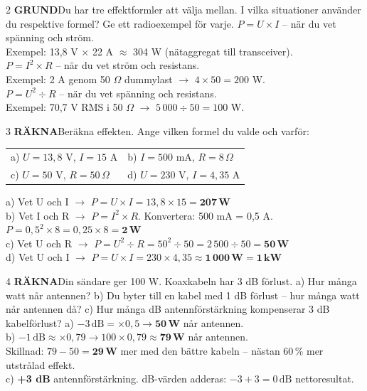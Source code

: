 \documentclass[a4paper,11pt,twoside]{book}
\newcommand{\qgrund}{\colorbox{greenpale}{\textcolor{greendark}{\headingfont\bfseries\tiny GRUND}}}
\newcommand{\qrakna}{\colorbox{bluepale}{\textcolor{bluedark}{\headingfont\bfseries\tiny RÄKNA}}}
\begin{document}
\begin{facitblock}{2}
\qgrund\quad Du har tre effektformler att välja mellan. I vilka situationer använder du respektive formel? Ge ett radioexempel för varje.
\tcblower
$P = U \times I$ – när du vet spänning och ström.\\
Exempel: 13,8 V $\times$ 22 A $\approx$ 304 W (nätaggregat till transceiver).\\[4pt]
$P = I^2 \times R$ – när du vet ström och resistans.\\
Exempel: 2 A genom 50 $\Omega$ dummylast $\rightarrow$ $4 \times 50 = 200$ W.\\[4pt]
$P = U^2 \div R$ – när du vet spänning och resistans.\\
Exempel: 70,7 V RMS i 50 $\Omega$ $\rightarrow$ $5\,000 \div 50 = 100$ W.
\end{facitblock}

\begin{facitblock}{3}
\qrakna\quad Beräkna effekten. Ange vilken formel du valde och varför:
\begin{center}
\begin{tabular}{ll}
a) $U = 13{,}8$ V, $I = 15$ A &
b) $I = 500$ mA, $R = 8\,\Omega$ \\[4pt]
c) $U = 50$ V, $R = 50\,\Omega$ &
d) $U = 230$ V, $I = 4{,}35$ A
\end{tabular}
\end{center}
\tcblower
a) Vet U och I $\rightarrow$ $P = U \times I = 13{,}8 \times 15 = \mathbf{207\,\text{W}}$\\
b) Vet I och R $\rightarrow$ $P = I^2 \times R$. Konvertera: 500 mA = 0,5 A.
$P = 0{,}5^2 \times 8 = 0{,}25 \times 8 = \mathbf{2\,\text{W}}$\\
c) Vet U och R $\rightarrow$ $P = U^2 \div R = 50^2 \div 50 = 2\,500 \div 50 = \mathbf{50\,\text{W}}$\\
d) Vet U och I $\rightarrow$ $P = U \times I = 230 \times 4{,}35 \approx \mathbf{1\,000\,\text{W} = 1\,\text{kW}}$
\end{facitblock}

\begin{facitblock}{4}
\qrakna\quad Din sändare ger 100 W. Koaxkabeln har 3 dB förlust. a) Hur många watt når antennen? b) Du byter till en kabel med 1 dB förlust – hur många watt når antennen då? c) Hur många dB antennförstärkning kompenserar 3 dB kabelförlust?
\tcblower
a) $-3\,\text{dB} = \times 0{,}5 \rightarrow \mathbf{50\,\text{W}}$ når antennen.\\
b) $-1\,\text{dB} \approx \times 0{,}79 \rightarrow 100 \times 0{,}79 \approx \mathbf{79\,\text{W}}$ når antennen.\\
Skillnad: $79 - 50 = \mathbf{29\,\text{W}}$ mer med den bättre kabeln – nästan 60\,\% mer utstrålad effekt.\\
c) \textbf{+3 dB} antennförstärkning. dB-värden adderas: $-3 + 3 = 0\,\text{dB}$ nettoresultat.
\end{facitblock}
\end{document}
